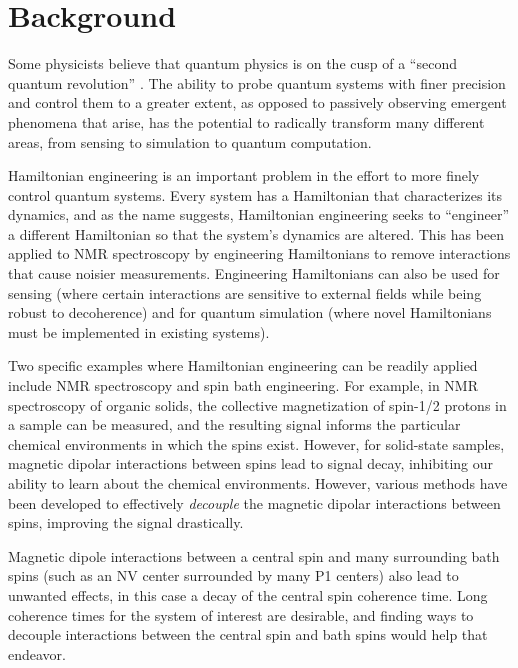 \chapter{Background}


Some physicists believe that quantum physics is on the cusp of a ``second quantum revolution'' \cite{quantum-rev}. The ability to probe quantum systems with finer precision and control them to a greater extent, as opposed to passively observing emergent phenomena that arise, has the potential to radically transform many different areas, from sensing to simulation to quantum computation.

Hamiltonian engineering is an important problem in the effort to more finely control quantum systems.
Every system has a Hamiltonian that characterizes its dynamics, and as the name suggests, Hamiltonian engineering seeks to ``engineer'' a different Hamiltonian so that the system's dynamics are altered. This has been applied to NMR spectroscopy by engineering Hamiltonians to remove interactions that cause noisier measurements. Engineering Hamiltonians can also be used for sensing (where certain interactions are sensitive to external fields while being robust to decoherence) and for quantum simulation (where novel Hamiltonians must be implemented in existing systems).

Two specific examples where Hamiltonian engineering can be readily applied include NMR spectroscopy and spin bath engineering. For example, in NMR spectroscopy of organic solids, the collective magnetization of spin-1/2 protons in a sample can be measured, and the resulting signal informs the particular chemical environments in which the spins exist. However, for solid-state samples, magnetic dipolar interactions between spins lead to signal decay,
inhibiting our ability to learn about the chemical environments. However, various methods have been developed to effectively \emph{decouple} the magnetic dipolar interactions between spins, improving the signal drastically.

Magnetic dipole interactions between a central spin and many surrounding bath spins (such as an NV center surrounded by many P1 centers) also lead to unwanted effects, in this case a decay of the central spin coherence time. Long coherence times for the system of interest are desirable, and finding ways to decouple interactions between the central spin and bath spins would help that endeavor.

